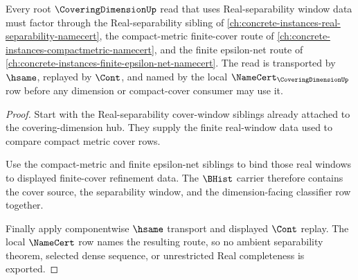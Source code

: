 \begin{theorem}
\label{thm:coveringdimension-root-real-separability-window-obligation}
Every root $\CoveringDimensionUp$ read that uses Real-separability window data must factor through the Real-separability sibling of \autoref{ch:concrete-instances-real-separability-namecert}, the compact-metric finite-cover route of \autoref{ch:concrete-instances-compactmetric-namecert}, and the finite epsilon-net route of \autoref{ch:concrete-instances-finite-epsilon-net-namecert}. The read is transported by $\hsame$, replayed by $\Cont$, and named by the local $\NameCert_{\CoveringDimensionUp}$ row before any dimension or compact-cover consumer may use it.
\end{theorem}
\begin{proof}
Start with the Real-separability cover-window siblings already attached to the covering-dimension hub. They supply the finite real-window data used to compare compact metric cover rows.

Use the compact-metric and finite epsilon-net siblings to bind those real windows to displayed finite-cover refinement data. The $\BHist$ carrier therefore contains the cover source, the separability window, and the dimension-facing classifier row together.

Finally apply componentwise $\hsame$ transport and displayed $\Cont$ replay. The local $\NameCert$ row names the resulting route, so no ambient separability theorem, selected dense sequence, or unrestricted Real completeness is exported.
\end{proof}
